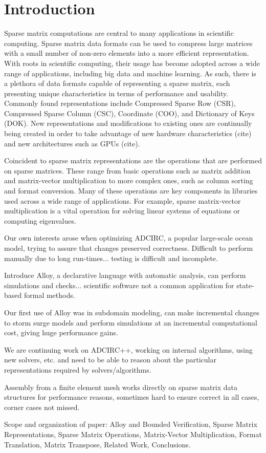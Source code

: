 \section{Introduction}
\label{sec:intro}

Sparse matrix computations are central to many applications in scientific computing.  Sparse matrix data formats can be used to compress large matrices with a small number of non-zero elements into a more efficient representation.  With roots in scientific computing, their usage has become adopted across a wide range of applications, including big data and machine learning.  As such, there is a plethora of data formats capable of representing a sparse matrix, each presenting unique characteristics in terms of performance and usability.  Commonly found representations include Compressed Sparse Row (CSR), Compressed Sparse Column (CSC), Coordinate (COO), and Dictionary of Keys (DOK).  New representations and modifications to existing ones are continually being created in order to take advantage of new hardware characteristics (cite) and new architectures such as GPUs (cite).

Coincident to sparse matrix representations are the operations that are performed on sparse matrices.  These range from basic operations such as matrix addition and matrix-vector multiplication to more complex ones, such as column sorting and format conversion.  Many of these operations are key components in libraries used across a wide range of applications.  For example, sparse matrix-vector multiplication is a vital operation for solving linear systems of equations or computing eigenvalues.

Our own interests arose when optimizing ADCIRC, a popular large-scale ocean model, trying to assure that changes preserved correctness.  Difficult to perform manually due to long run-times... testing is difficult and incomplete.

Introduce Alloy, a declarative language with automatic analysis, can perform simulations and checks... scientific software not a common application for state-based formal methods.

Our first use of Alloy was in subdomain modeling, can make incremental changes to storm surge models and perform simulations at an incremental computational cost, giving huge performance gains.

We are continuing work on ADCIRC++, working on internal algorithms, using new solvers, etc. and need to be able to reason about the particular representations required by solvers/algorithms.

Assembly from a finite element mesh works directly on sparse matrix data structures for performance reasons, sometimes hard to ensure correct in all cases, corner cases not missed.

Scope and organization of paper: Alloy and Bounded Verification, Sparse Matrix Representations, Sparse Matrix Operations, Matrix-Vector Multiplication, Format Translation, Matrix Transpose, Related Work, Conclusions.
